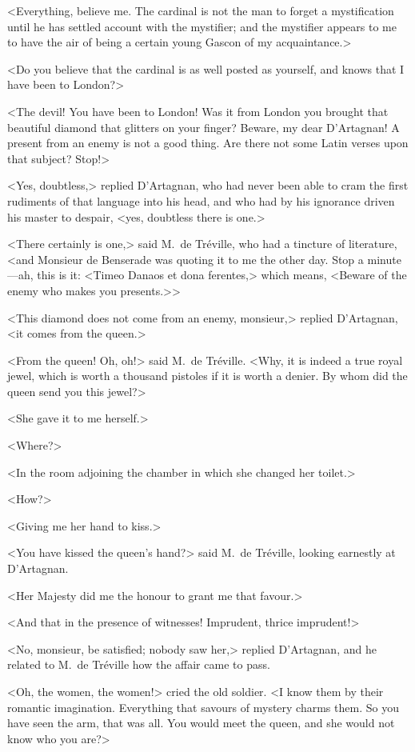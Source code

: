<Everything, believe me. The cardinal is not the man to forget a mystification until he has settled account with the mystifier; and the mystifier appears to me to have the air of being a certain young Gascon of my acquaintance.> 

<Do you believe that the cardinal is as well posted as yourself, and knows that I have been to London?> 

<The devil! You have been to London! Was it from London you brought that beautiful diamond that glitters on your finger? Beware, my dear D'Artagnan! A present from an enemy is not a good thing. Are there not some Latin verses upon that subject? Stop!> 

<Yes, doubtless,> replied D'Artagnan, who had never been able to cram the first rudiments of that language into his head, and who had by his ignorance driven his master to despair, <yes, doubtless there is one.> 

<There certainly is one,> said M.~de Tréville, who had a tincture of literature, <and Monsieur de Benserade was quoting it to me the other day. Stop a minute—ah, this is it: <Timeo Danaos et dona ferentes,> which means, <Beware of the enemy who makes you presents.>> 

<This diamond does not come from an enemy, monsieur,> replied D'Artagnan, <it comes from the queen.> 

<From the queen! Oh, oh!> said M.~de Tréville. <Why, it is indeed a true royal jewel, which is worth a thousand pistoles if it is worth a denier. By whom did the queen send you this jewel?> 

<She gave it to me herself.> 

<Where?> 

<In the room adjoining the chamber in which she changed her toilet.> 

<How?> 

<Giving me her hand to kiss.> 

<You have kissed the queen's hand?> said M.~de Tréville, looking earnestly at D'Artagnan. 

<Her Majesty did me the honour to grant me that favour.> 

<And that in the presence of witnesses! Imprudent, thrice imprudent!> 

<No, monsieur, be satisfied; nobody saw her,> replied D'Artagnan, and he related to M.~de Tréville how the affair came to pass. 

<Oh, the women, the women!> cried the old soldier. <I know them by their romantic imagination. Everything that savours of mystery charms them. So you have seen the arm, that was all. You would meet the queen, and she would not know who you are?> 

